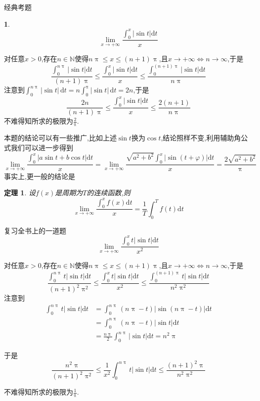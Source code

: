 \documentclass[UTF8,no-math,12pt,openany,table,dvipsnames,svgnames]{book}
\renewcommand{\pi}{\uppi}
\newcommand{\hei}{\CJKfamily{hei}}
\newenvironment{solve}{\par\indent{\hei 解}\hspace{1em}}{\par}
\newtheorem{theorem}{定理}
\newtheorem{example}{}
\renewcommand{\le}{\leqslant}
\newenvironment{note}{\par\CJKfamily{note}\noindent{\makebox[0pt][r]{\scriptsize\color{red!90}
\textdbend\quad}\textbf{注:}}}{\par}
\begin{document}
\begin{MYBOX}{经典考题}
\begin{example}
\[
\lim_{x\rightarrow +\infty} \frac{\int_0^x{\left| \sin t \right|\mathrm{d}t}}{x}
\]
\end{example}
\tcblower
\begin{solve}
对任意$x>0$,存在$n\in\mathbb N$使得$n\pi\le x\le(n+1)\pi$,且$x\to+\infty\Leftrightarrow n\to\infty$,于是
\[
\frac{\int_0^{n\pi}{\left| \sin t \right|\mathrm{d}t}}{\left( n+1 \right) \pi}\leqslant \frac{\int_0^x{\left| \sin t \right|\mathrm{d}t}}{x}\leqslant \frac{\int_0^{\left( n+1 \right) \pi}{\left| \sin t \right|\mathrm{d}t}}{n\pi}
\]
注意到$\int_0^{n\pi}|\sin t|\,\mathrm dt=n\int_0^\pi|\sin t|\,\mathrm dt=2n$,于是
\[
\frac{2n}{\left( n+1 \right) \pi}\leqslant \frac{\int_0^x{\left| \sin t \right|\mathrm{d}t}}{x}\leqslant \frac{2\left( n+1 \right)}{n\pi}
\]
不难得知所求的极限为$\frac2\pi$.
\end{solve}
\end{MYBOX}
\begin{note}
本题的结论可以有一些推广,比如上述$\sin t$换为$\cos t$,结论照样不变,利用辅助角公式我们可以进一步得到
\[
\lim_{x\rightarrow +\infty} \frac{\int_0^x{\left| a\sin t+b\cos t \right|\text{d}t}}{x}=\lim_{x\rightarrow +\infty} \frac{\sqrt{a^2+b^2}\int_0^x{\left| \sin \left( t+\varphi \right) \right|\text{d}t}}{x}=\frac{2\sqrt{a^2+b^2}}{\pi}
\]
事实上,更一般的结论是
\begin{theorem}
设$f(x)$是周期为$T$的连续函数,则
\[
\lim_{x\rightarrow +\infty} \frac{\int_0^x{f\left( x \right) \mathrm{d}t}}{x}=\frac{1}{T}\int_0^T{f\left( t \right) \mathrm{d}t}
\]
\end{theorem}
\end{note}
\begin{MYBOX}{复习全书上的一道题}
\[
\lim_{x\rightarrow +\infty} \frac{\int_0^x{t\left| \sin t \right|\text{d}t}}{x^2}
\]
\tcblower
\begin{solve}
对任意$x>0$,存在$n\in\mathbb N$使得$n\pi\le x\le(n+1)\pi$,且$x\to+\infty\Leftrightarrow n\to\infty$,于是
\[
\frac{\int_0^{n\pi}{t\left| \sin t \right|\mathrm{d}t}}{\left( n+1 \right)^2 \pi^2}\leqslant \frac{\int_0^x{t\left| \sin t \right|\mathrm{d}t}}{x^2}\leqslant \frac{\int_0^{\left( n+1 \right) \pi}{t\left| \sin t \right|\mathrm{d}t}}{n^2\pi^2}
\]
注意到
\begin{align*}
\boxed{\int_0^{n\pi}{t\left| \sin t \right|\mathrm{d}t}}&=\int_0^{n\pi}{\left( n\pi -t \right) \left| \sin \left( n\pi -t \right) \right|\mathrm{d}t}\\
&=\boxed{\int_0^{n\pi}{\left( n\pi -t \right) \left| \sin t \right|\mathrm{d}t}}\\
&=\frac{n\pi}{2}\int_0^{n\pi}{\left| \sin t \right|\text{d}t}=n^2\pi
\end{align*}

于是
\[
\frac{n^2\pi}{\left( n+1 \right) ^2\pi ^2}\leqslant \frac{1}{x^2}\int_0^{n\pi}{t\left| \sin t \right|\text{d}t}\leqslant \frac{\left( n+1 \right) ^2\pi}{n^2\pi ^2}
\]

不难得知所求的极限为$\frac1\pi$.
\end{solve}
\end{MYBOX}
\end{document}
